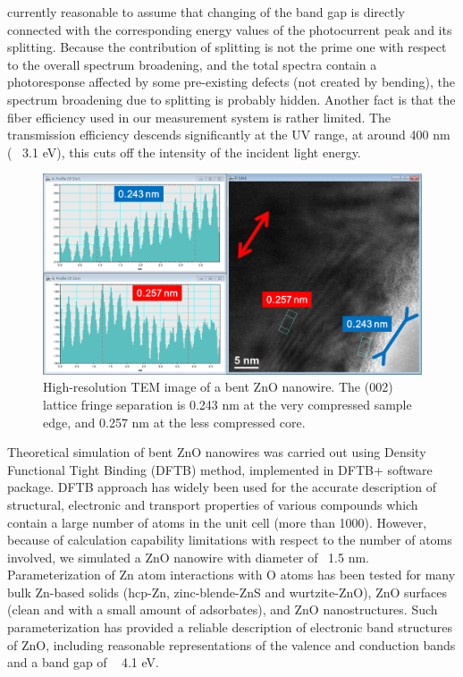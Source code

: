 currently reasonable to assume that changing of the band gap is directly connected with the corresponding energy values of the photocurrent peak and its splitting. Because the contribution of splitting is not the prime one with respect to the overall spectrum broadening, and the total spectra contain a photoresponse affected by some pre-existing defects (not created by bending), the spectrum broadening due to splitting is probably hidden. Another fact is that the fiber efficiency used in our measurement system is rather limited. The transmission efficiency descends significantly at the UV range, at around 400 nm (~ 3.1 eV), this cuts off the intensity of the incident light energy. 

\begin{figure}  
\centering
\includegraphics[width=\textwidth]{figures/figure5_s2}
\caption[Localized strain in HRTEM image]{High-resolution TEM image of a bent ZnO nanowire. The (002) lattice fringe separation is 0.243 nm at the very compressed sample edge, and 0.257 nm at the less compressed core. 
\label{fig:5_s2}}
\end{figure}


Theoretical simulation of bent ZnO nanowires was carried out using Density Functional Tight Binding (DFTB) method, implemented in DFTB+ software package.\cite{T.2007} DFTB approach has widely been used for the accurate description of structural, electronic and transport properties of various compounds which contain a large number of atoms in the unit cell (more than 1000). However, because of calculation capability limitations with respect to the number of atoms involved, we simulated a ZnO nanowire with diameter of ~1.5 nm. Parameterization of Zn atom interactions with O atoms has been tested for many bulk Zn-based solids (hcp-Zn, zinc-blende-ZnS and wurtzite-ZnO), ZnO surfaces (clean and with a small amount of adsorbates), and ZnO nanostructures. Such parameterization has provided a reliable description of electronic band structures of ZnO, including reasonable representations of the valence and conduction bands and a band gap of ~ 4.1 eV.\cite{T.2009}

